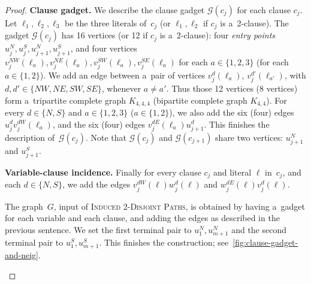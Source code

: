 \documentclass[a4paper,UKenglish,cleveref,autoref]{lipics-v2021}
\begin{document}
\begin{proof}
 \medskip

 \textbf{Clause gadget.}
 We describe the clause gadget $\mathcal G(c_j)$ for each clause $c_j$.
 Let $\ell_1, \ell_2, \ell_3$ be the three literals of~$c_j$ (or $\ell_1, \ell_2$ if $c_j$ is a~2-clause).
 The gadget $\mathcal G(c_j)$ has 16 vertices (or 12 if $c_j$ is a~2-clause): four \emph{entry points} $u^N_j, u^S_j, u^N_{j+1}, u^S_{j+1}$, and four vertices $v_j^{NW}(\ell_a), v_j^{NE}(\ell_a), v_j^{SW}(\ell_a), v_j^{SE}(\ell_a)$ for each $a \in \{1,2,3\}$ (for each $a \in \{1,2\}$).
 We add an edge between a~pair of vertices $v_j^d(\ell_a)$, $v_j^{d'}(\ell_{a'})$, with $d, d' \in \{NW,NE,SW,SE\}$, whenever $a \neq a'$.
 Thus those 12 vertices (8 vertices) form a~tripartite complete graph $K_{4,4,4}$ (bipartite complete graph $K_{4,4}$).
 For every $d \in \{N,S\}$ and $a \in \{1,2,3\}$ ($a \in \{1,2\}$), we also add the six (four) edges $u^d_j v_j^{dW}(\ell_a)$, and the six (four) edges $v_j^{dE}(\ell_a) u^d_{j+1}$.
 This finishes the description of~$\mathcal G(c_j)$.
 Note that $\mathcal G(c_j)$ and $\mathcal G(c_{j+1})$ share two vertices: $u^N_{j+1}$ and $u^S_{j+1}$.

 \medskip

 \textbf{Variable-clause incidence.}
 Finally for every clause $c_j$ and literal $\ell$ in~$c_j$, and each $d \in \{N,S\}$, we add the edges $v_j^{dW}(\ell)w_j^d(\ell)$ and $w_j^{dE}(\ell)v_j^{d}(\ell)$.

 \medskip
 
 The graph~$G$, input of \textsc{Induced 2-Disjoint Paths}, is obtained by having a~gadget for each variable and each clause, and adding the edges as described in the previous sentence. 
 We set the first terminal pair to $u^N_1, u^N_{m+1}$ and the second terminal pair to $u^S_1, u^S_{m+1}$.
 This finishes the construction; see~\cref{fig:clause-gadget-and-neig}.  
 \begin{figure}[h!]
   \centering
\end{figure}
\end{proof}
\end{document}
